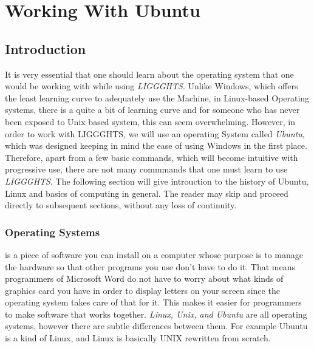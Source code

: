 \documentclass{tufte-book} %
\newcommand{\Li}{\textit{LIGGGHTS}}
\begin{document}

\chapter{Working With Ubuntu}
\label{ch:1}


\section{Introduction}

\begin{fullwidth}
  It is very essential that one should learn about the operating system that one would be working with while using \textsc{\Li}. Unlike Windows, which offers the least learning curve to adequately use the Machine, in Linux-based Operating systems, there is a quite a bit of learning curve and for someone who has never been exposed to Unix based system, this can seem overwhelming. However, in order to work with \textsc{LIGGGHTS}, we will use an operating System called \emph{Ubuntu}, which was designed keeping in mind the ease of using Windows in the first place. Therefore, apart from a few basic commands, which will become intuitive with progressive use, there are not many commmands that one must learn to use \textsc{\Li}. The following section will give introuction to the history of Ubuntu, Linux and basics of computing in general. The reader may skip and proceed directly to subsequent sections, without any loss of continuity.
\end{fullwidth}
\subsection{Operating Systems}

 is a piece of software you can install on a computer whose purpose is to manage the hardware so that other programs you use don't have to do it. That means programmers of Microsoft Word do not have to worry about what kinds of graphics card you have in order to display letters on your screen since the operating system takes care of that for it. This makes it easier for programmers to make software that works together. 
\emph{Linux, Unix, and Ubuntu} are all operating systems, however there are subtle differences between them. For example Ubuntu is a kind of Linux, and Linux is basically UNIX rewritten from scratch.
\end{document}
